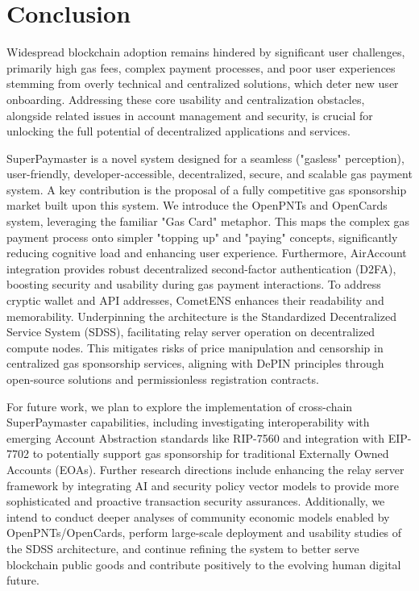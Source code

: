 \documentclass[preprint,12pt]{elsarticle}
\begin{document}
\section{Conclusion}
\label{sec:conclusion}

Widespread blockchain adoption remains hindered by significant user challenges, primarily high gas fees, complex payment processes, and poor user experiences stemming from overly technical and centralized solutions, which deter new user onboarding. Addressing these core usability and centralization obstacles, alongside related issues in account management and security, is crucial for unlocking the full potential of decentralized applications and services.

SuperPaymaster is a novel system designed for a seamless ("gasless" perception), user-friendly, developer-accessible, decentralized, secure, and scalable gas payment system. A key contribution is the proposal of a fully competitive gas sponsorship market built upon this system. We introduce the OpenPNTs and OpenCards system, leveraging the familiar "Gas Card" metaphor. This maps the complex gas payment process onto simpler "topping up" and "paying" concepts, significantly reducing cognitive load and enhancing user experience. Furthermore, AirAccount integration provides robust decentralized second-factor authentication (D2FA), boosting security and usability during gas payment interactions. To address cryptic wallet and API addresses, CometENS enhances their readability and memorability. Underpinning the architecture is the Standardized Decentralized Service System (SDSS), facilitating relay server operation on decentralized compute nodes. This mitigates risks of price manipulation and censorship in centralized gas sponsorship services, aligning with DePIN principles through open-source solutions and permissionless registration contracts.

For future work, we plan to explore the implementation of cross-chain SuperPaymaster capabilities, including investigating interoperability with emerging Account Abstraction standards like RIP-7560\cite{rip7560} and integration with EIP-7702\cite{eip7702} to potentially support gas sponsorship for traditional Externally Owned Accounts (EOAs). Further research directions include enhancing the relay server framework by integrating AI and security policy vector models to provide more sophisticated and proactive transaction security assurances. Additionally, we intend to conduct deeper analyses of community economic models enabled by OpenPNTs/OpenCards, perform large-scale deployment and usability studies of the SDSS architecture, and continue refining the system to better serve blockchain public goods and contribute positively to the evolving human digital future.
\end{document}
